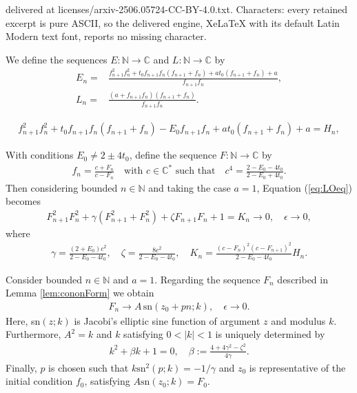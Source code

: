 \documentclass[10pt,a4paper]{amsart}
\begin{document}
delivered at licenses/arxiv-2506.05724-CC-BY-4.0.txt. Characters: every retained excerpt is pure ASCII, so the delivered engine, XeLaTeX with its default Latin Modern text font, reports no missing character.
\begin{definition}\label{def:E}
    We define the sequences $E:\mathbb{N}\rightarrow\mathbb{C}$ and $L:\mathbb{N}\rightarrow\mathbb{C}$ by
    \begin{align}\label{eq:invariant}
        E_n=&\frac{f_{n+1}^2f_n^2+t_0f_{n+1}f_n(f_{n+1}+f_n)+at_0(f_{n+1}+f_{n})+a}{f_{n+1}f_n},\\
        L_n=&\frac{(a+f_{n+1}f_n)(f_{n+1}+f_n)}{f_{n+1}f_n}.
    \end{align}    
\end{definition}

\begin{align}\label{eq:LOeq}
    f_{n+1}^2f_n^2+t_0f_{n+1}f_n(f_{n+1}+f_n)-E_0f_{n+1}f_n+at_0(f_{n+1}+f_{n})+a=H_n,
\end{align}

\begin{lemma}\label{lem:cononForm}
    With conditions $E_0\neq 2\pm4t_0$, define the sequence $F:\mathbb{N}\rightarrow\mathbb{C}$ by
    \begin{align*}
        f_n=\frac{c+F_n}{c-F_n}\quad\text{with $c\in\mathbb{C}^*$ such that}\quad c^4=\frac{2-E_0-4t_0}{2-E_0+4t_0}.
    \end{align*}
    Then considering bounded $n\in\mathbb{N}$ and taking the case $a=1$, Equation (\ref{eq:LOeq}) becomes
    \begin{align*}
        F_{n+1}^2F_{n}^2+\gamma\left(F_{n+1}^2+F_{n}^2\right)+\zeta F_{n+1}F_n+1=K_n\to0,\quad\epsilon\to0,
    \end{align*}
    where
    \begin{align*}
        \gamma=\frac{(2+E_0)c^2}{2-E_0-4t_0},\quad\zeta=\frac{8c^2}{2-E_0-4t_0},\quad K_n=\frac{(c-F_n)^2(c-F_{n+1})^2}{2-E_0-4t_0}H_n.
    \end{align*}
\end{lemma}

\begin{theorem}\label{thrm:elliptic}
    Consider bounded $n\in\mathbb{N}$ and  $a=1$. Regarding the sequence $F_n$ described in Lemma \ref{lem:cononForm} we obtain
    \begin{align*}
        F_n\to A\,\text{sn}(z_0+pn;k),\quad\epsilon\rightarrow0.
    \end{align*}
    Here, sn$(z;k)$ is Jacobi's elliptic sine function of argument $z$ and modulus $k$. Furthermore, $A^2=k$ and $k$ satisfying $0<|k|<1$ is uniquely determined by
    \begin{align*}
        k^2+\beta k+1=0,\quad \beta:=\frac{4+4\gamma^2-\zeta^2}{4\gamma}.
    \end{align*}
    Finally, $p$ is chosen such that $k\text{sn}^2(p;k)=-1/\gamma$ and $z_0$ is representative of the initial condition $f_0$, satisfying $A\text{sn}(z_0;k)=F_0$.
\end{theorem}
\end{document}
